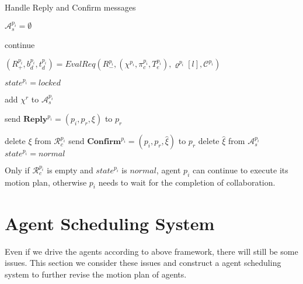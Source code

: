 \documentclass[journal]{IEEEtran}
\begin{document}
\begin{algorithm}
  \caption{Handle Reply and Confirm messages}
  $\mathcal{A}^{p_i}_s=\emptyset$

  {
    {
        {
            continue
        }
        {
            $(R^{p_i}_+,b^{p_i}_d,t^{p_i}_d)=EvalReq(R^{p_i}_-,(\chi^{p_i},\pi_c^{p_i},T^{p_i}_e),\varrho^{p_i}[l],\mathcal{C}^{p_i})$

            $state^{p_i}=locked$

            add $\chi^{r}$ to $\mathcal{A}^{p_i}_s$

            send $\textbf{Reply}^{p_i}=(p_i,p_r,\xi)$ to $p_r$
        }
    }
  }
  {
    {
        {
            delete $\xi$ from $\mathcal{R}^{p_i}_c$
        }
        {
            send $\textbf{Confirm}^{p_i}=(p_i,p_r,\hat{\xi})$ to $p_r$
        }
    }
  }
  {
    {
        {
            delete $\hat{\xi}$ from $\mathcal{A}^{p_i}_s$
        }
        {
            $state^{p_i}=normal$
        }
    }
  }
\end{algorithm}
Only if $\mathcal{R}^{p_i}_c$ is empty and $state^{p_i}$ is $normal$, agent $p_i$ can continue to execute its motion plan, otherwise $p_i$ needs to wait for the completion of collaboration.
\section{Agent Scheduling System}
Even if we drive the agents according to above framework, there will still be some issues. This section we consider these issues and construct a agent scheduling system to further revise the motion plan of agents.
\end{document}
